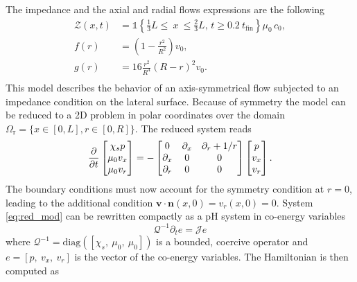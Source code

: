 \documentclass{ifacconf}
\begin{document}
The impedance and the axial and radial flows expressions are the following
\begin{equation*}
\begin{aligned}
\mathcal{Z}(x, t) &= \mathds{1}\left\{ \frac{1}{3} L \leq \ x \ \leq \frac{2}{3} L, \,  t \geq 0.2 \ t_{\text{fin}} \right\} \mu_0 \, c_0, \\
f(r) &= \left( 1 - \frac{r^2}{R^2} \right) v_0, \\
g(r) &= 16 \frac{r^2}{R^4} \left( R - r \right)^2 v_0. \\
\end{aligned}
\end{equation*}
 This model describes the behavior of an axis-symmetrical flow subjected to an impedance condition on the lateral surface. Because of symmetry the model can be reduced to a 2D problem in polar coordinates over the domain $\Omega_{\text{r}} = \{x \in [0, L], r \in [0, R]\}$. The reduced system reads
\begin{equation}
\label{eq:red_mod}
    \diffp{}{t}
    \begin{bmatrix}
    \chi_s p \\
    \mu_0 v_x \\
    \mu_0 v_r \\
    \end{bmatrix} = -
    \begin{bmatrix}
    0 & \partial_x & \partial_r + 1/r \\
    \partial_x & 0 & 0 \\
    \partial_r & 0 & 0 \\
    \end{bmatrix}
    \begin{bmatrix}
    p \\
    v_x \\
    v_r \\
    \end{bmatrix}.
\end{equation}
The boundary conditions must now account for the symmetry condition at $r=0$, leading to the additional condition $\bm{v}\cdot \bm{n}(x, 0) = v_r(x, 0) =0$. System \eqref{eq:red_mod} can be rewritten compactly as a pH system in co-energy variables 
\begin{equation}
\label{eq:sys_ph}
    \mathcal{Q}^{-1} \partial_t{e} = \mathcal{J} e
\end{equation}
where $\mathcal{Q}^{-1} = \mathrm{diag}([\chi_s, \ \mu_0, \ \mu_0])$ is a bounded, coercive operator and $e = [p, \ v_x, \ v_r]$ is the vector of the co-energy variables. The Hamiltonian is then computed as
\end{document}

